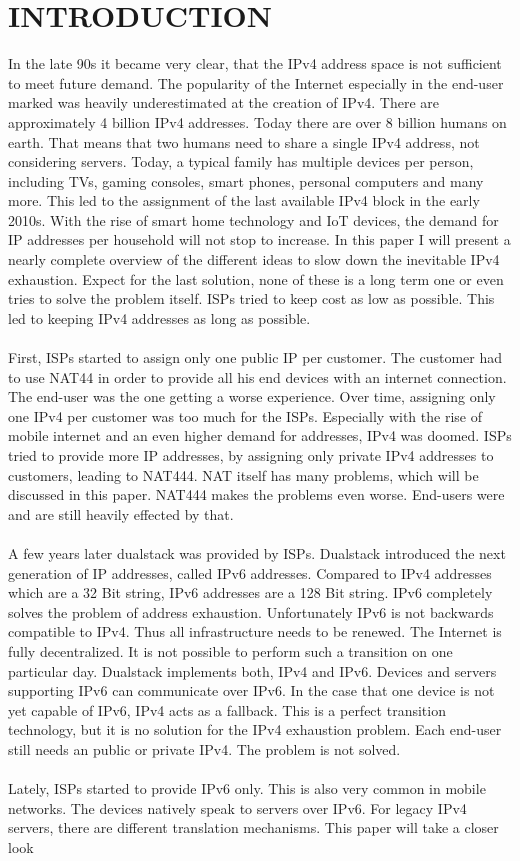 \documentclass[format=sigconf, natbib=true, nonacm=true]{acmart}
\begin{document}
    \section{INTRODUCTION}
    In the late 90s it became very clear, that the IPv4 address space is not sufficient to meet future demand. The popularity of the Internet especially in the end-user marked was heavily underestimated at the creation of IPv4. There are approximately 4 billion IPv4 addresses. Today there are over 8 billion humans on earth. That means that two humans need to share a single IPv4 address, not considering servers. Today, a typical family has multiple devices per person, including TVs, gaming consoles, smart phones, personal computers and many more. This led to the assignment of the last available IPv4 block in the early 2010s. With the rise of smart home technology and IoT devices, the demand for IP addresses per household will not stop to increase. In this paper I will present a nearly complete overview of the different ideas to slow down the inevitable IPv4 exhaustion. Expect for the last solution, none of these is a long term one or even tries to solve the problem itself. ISPs tried to keep cost as low as possible. This led to keeping IPv4 addresses as long as possible.\\\\First, ISPs started to assign only one public IP per customer. The customer had to use NAT44 in order to provide all his end devices with an internet connection. The end-user was the one getting a worse experience. Over time, assigning only one IPv4 per customer was too much for the ISPs. Especially with the rise of mobile internet and an even higher demand for addresses, IPv4 was doomed. ISPs tried to provide more IP addresses, by assigning only private IPv4 addresses to customers, leading to NAT444. NAT itself has many problems, which will be discussed in this paper. NAT444 makes the problems even worse. End-users were and are still heavily effected by that.\\\\A few years later dualstack was provided by ISPs. Dualstack introduced the next generation of IP addresses, called IPv6 addresses. Compared to IPv4 addresses which are a 32 Bit string, IPv6 addresses are a 128 Bit string. IPv6 completely solves the problem of address exhaustion. Unfortunately IPv6 is not backwards compatible to IPv4. Thus all infrastructure needs to be renewed. The Internet is fully decentralized. It is not possible to perform such a transition on one particular day. Dualstack implements both, IPv4 and IPv6. Devices and servers supporting IPv6 can communicate over IPv6. In the case that one device is not yet capable of IPv6, IPv4 acts as a fallback. This is a perfect transition technology, but it is no solution for the IPv4 exhaustion problem. Each end-user still needs an public or private IPv4. The problem is not solved.\\\\Lately, ISPs started to provide IPv6 only. This is also very common in mobile networks. The devices natively speak to servers over IPv6. For legacy IPv4 servers, there are different translation mechanisms. This paper will take a closer look 
\end{document}
